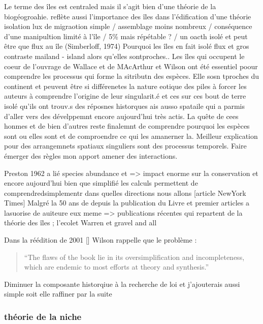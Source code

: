 Le terme des îles est centraled mais il s'agit bien d'une théorie de la
biogéogroahie. reflète aussi l'importance des îles dans l'édification
d'une théorie isolation lux de migraotion simple / assemblage moins
nombreux / conséquence d'une manipultion limité à l'île / 5\% mais
répétable ? / un oacth isolé et peut être que flux au île (Simberloff,
1974) Pourquoi les îles en fait isolé flux et gros contraste mailand -
island alors qu'elles sontproches.. Les îles qui occupent le coeur de
l'ouvrage de Wallace et de MAcArthur et Wilson ont été essentiel poour
comprendre les processus qui forme la sitributn des espèces. Elle sosn
tproches du continent et peuvent être si différenetes la nature eotique
des piles à forcer les auteurs à comprendre l'origine de leur
singularit.é et ces sur ces bout de terre isolé qu'ils ont trouv.s des
réposnes historques ais ausso spataile qui a parmis d'aller vers des
dévelppemnt encore aujourd'hui très actis. La quête de cees honmes et de
bien d'autres reste finalemnt de comprendre pourquoi les espèces sont ou
elles sont et de comproendre ce qui les amanerner la. Meilleur
explication pour des arrangemnets spatiaux singuliers sont des processus
temporels. Faire émerger des règles mon apport amener des interactions.

Preston 1962 a lié species abundance et =\textgreater{} impact enorme
sur la conservation et encore aujourd'hui bien que simplifié les calculs
permettent de comprendredsimplementr dans quelles directions nous allons
{[}article NewYork Times{]} Malgré la 50 ans de depuis la publication du
Livre et premier articles a lasuorise de auiteure eux meme
=\textgreater{} publications récentes qui repartent de la théorie des
îles ; l'ecolet Warren et gravel and all

Dans la réédition de 2001 {[}{]} Wilson rappelle que le problème :

\begin{quote}
``The flaws of the book lie in its oversimplification and
incompleteness, which are endemic to most efforts at theory and
synthesis.''
\end{quote}

Diminuer la composante historqiue à la recherche de loi et j'ajouterais
aussi simple soit elle raffiner par la suite

\subsubsection{théorie de la niche}\label{thuxe9orie-de-la-niche}

